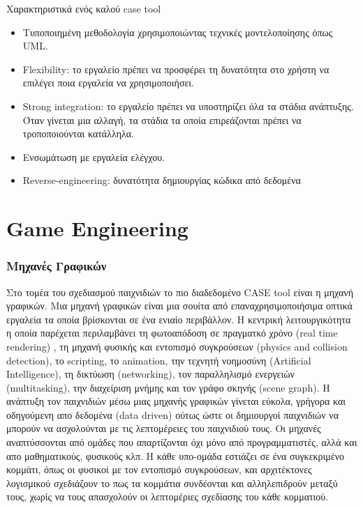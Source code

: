\documentclass[oneside, 12pt]{book}
\begin{document}
	Χαρακτηριστικά ενός καλού case tool
	\begin{itemize}
	\item Τυποποιημένη μεθοδολογία χρησιμοποιώντας τεχνικές μοντελοποίησης όπως UML.
	\item Flexibility: το εργαλείο πρέπει να προσφέρει τη δυνατότητα στο χρήστη να επιλέγει ποια εργαλεία να χρησιμοποιήσει.
	\item Strong integration: το εργαλείο πρέπει να υποστηρίζει όλα τα στάδια ανάπτυξης. Όταν γίνεται μια αλλαγή, τα στάδια τα οποία επιρεάζονται πρέπει να τροποποιούνται κατάλληλα.
	\item Ενσωμάτωση με εργαλεία ελέγχου.
	\item Reverse-engineering: δυνατότητα δημιουργίας κώδικα από δεδομένα
	\end{itemize}
		
	\chapter{Game Engineering}
			
	\subsection{Μηχανές Γραφικών}
	Στο τομέα του σχεδιασμού παιχνιδιών το πιο διαδεδομένο CASE tool είναι η μηχανή γραφικών. Μια μηχανή γραφικών είναι μια σουίτα από επαναχρησιμοποιήσιμα οπτικά εργαλεία τα οποία βρίσκονται σε ένα ενιαίο περιβάλλον.
	Η κεντρική λειτουργικότητα η οποία παρέχεται περιλαμβάνει τη φωτοαπόδοση σε πραγματκό χρόνο (real time rendering) , τη μηχανή φυσικής και εντοπισμό συγκρούσεων (physics and collision detection), το scripting, το animation, την τεχνητή νοημοσύνη (Artificial Intelligence), τη δικτύωση (networking), τον παραλληλισμό ενεργειών (multitasking), την διαχείριση μνήμης και τον γράφο σκηνής (scene graph). Η ανάπτυξη τον παιχνιδιών μέσω μιας μηχανής γραφικών γίνεται εύκολα, γρήγορα και οδηγούμενη απο δεδομένα (data driven) ούτως ώστε οι δημιουργοί παιχνιδιών να μπορούν να ασχολούνται με τις λεπτομέρειες του παιχνιδιού τους.
	Οι μηχανές αναπτύσσονται από ομάδες που απαρτίζονται όχι μόνο από προγραμματιστές, αλλά και απο μαθηματικούς, φυσικούς κλπ. Η κάθε υπο-ομάδα εστιάζει σε ένα συγκεκριμένο κομμάτι, όπως οι φυσικοί με τον εντοπισμό συγκρούσεων, και αρχιτέκτονες λογισμικού σχεδιάζουν το πως τα κομμάτια συνδέονται και αλληλεπιδρούν μεταξύ τους, χωρίς να τους απασχολούν οι λεπτομέριες σχεδίασης του κάθε κομματιού.
	
\end{document}
